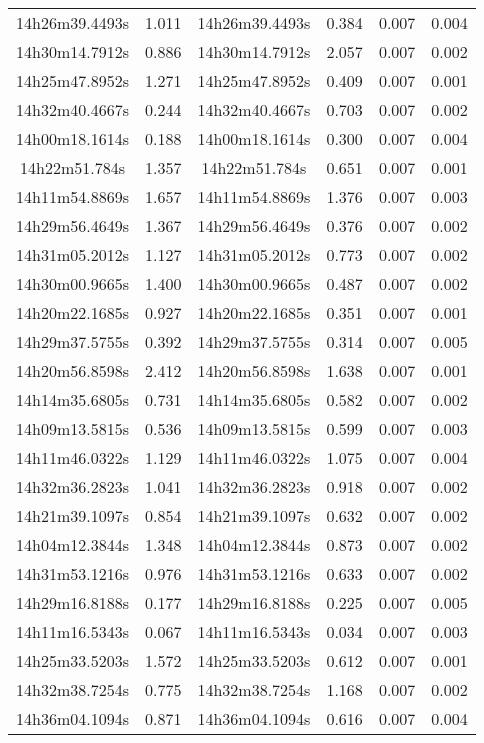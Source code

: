 \begin{table}
\begin{tabular}{cccccc}
14h26m39.4493s & 1.011 & 14h26m39.4493s & 0.384 & 0.007 & 0.004 \\
14h30m14.7912s & 0.886 & 14h30m14.7912s & 2.057 & 0.007 & 0.002 \\
14h25m47.8952s & 1.271 & 14h25m47.8952s & 0.409 & 0.007 & 0.001 \\
14h32m40.4667s & 0.244 & 14h32m40.4667s & 0.703 & 0.007 & 0.002 \\
14h00m18.1614s & 0.188 & 14h00m18.1614s & 0.300 & 0.007 & 0.004 \\
14h22m51.784s & 1.357 & 14h22m51.784s & 0.651 & 0.007 & 0.001 \\
14h11m54.8869s & 1.657 & 14h11m54.8869s & 1.376 & 0.007 & 0.003 \\
14h29m56.4649s & 1.367 & 14h29m56.4649s & 0.376 & 0.007 & 0.002 \\
14h31m05.2012s & 1.127 & 14h31m05.2012s & 0.773 & 0.007 & 0.002 \\
14h30m00.9665s & 1.400 & 14h30m00.9665s & 0.487 & 0.007 & 0.002 \\
14h20m22.1685s & 0.927 & 14h20m22.1685s & 0.351 & 0.007 & 0.001 \\
14h29m37.5755s & 0.392 & 14h29m37.5755s & 0.314 & 0.007 & 0.005 \\
14h20m56.8598s & 2.412 & 14h20m56.8598s & 1.638 & 0.007 & 0.001 \\
14h14m35.6805s & 0.731 & 14h14m35.6805s & 0.582 & 0.007 & 0.002 \\
14h09m13.5815s & 0.536 & 14h09m13.5815s & 0.599 & 0.007 & 0.003 \\
14h11m46.0322s & 1.129 & 14h11m46.0322s & 1.075 & 0.007 & 0.004 \\
14h32m36.2823s & 1.041 & 14h32m36.2823s & 0.918 & 0.007 & 0.002 \\
14h21m39.1097s & 0.854 & 14h21m39.1097s & 0.632 & 0.007 & 0.002 \\
14h04m12.3844s & 1.348 & 14h04m12.3844s & 0.873 & 0.007 & 0.002 \\
14h31m53.1216s & 0.976 & 14h31m53.1216s & 0.633 & 0.007 & 0.002 \\
14h29m16.8188s & 0.177 & 14h29m16.8188s & 0.225 & 0.007 & 0.005 \\
14h11m16.5343s & 0.067 & 14h11m16.5343s & 0.034 & 0.007 & 0.003 \\
14h25m33.5203s & 1.572 & 14h25m33.5203s & 0.612 & 0.007 & 0.001 \\
14h32m38.7254s & 0.775 & 14h32m38.7254s & 1.168 & 0.007 & 0.002 \\
14h36m04.1094s & 0.871 & 14h36m04.1094s & 0.616 & 0.007 & 0.004 \\

\end{tabular}
\end{table}

